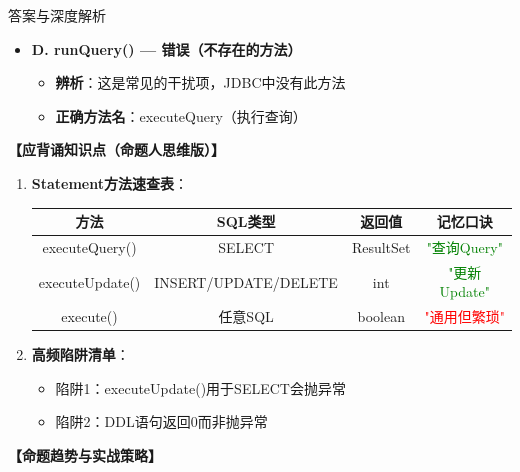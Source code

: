\documentclass[12pt, a4paper]{ctexart}
\begin{document}
\begin{enumerate}[label=\textbf{\arabic*.}]
\begin{bluebox}{答案与深度解析}
\begin{itemize}[label={}, leftmargin=*, nosep]
\begin{itemize}[label={}, nosep]
\begin{lstlisting}[language=Java]
    ResultSet rs = stmt.getResultSet();
} else {
    int updateCount = stmt.getUpdateCount();
}
      \end{lstlisting}
					  \end{itemize}
		      \item \textbf{D. runQuery() — 错误（不存在的方法）}
					  \begin{itemize}[label={}, nosep]
			      \item \textbf{辨析}：这是常见的干扰项，JDBC中没有此方法
			      \item \textbf{正确方法名}：executeQuery（执行查询）
					  \end{itemize}
					  \end{itemize}
\textbf{【应背诵知识点（命题人思维版）】}
		      \begin{enumerate}[label={}, leftmargin=*, nosep]
			      \item \textbf{Statement方法速查表}：
			            \begin{tabular}{|c|c|c|c|}
				            \hline
				            \textbf{方法}     & \textbf{SQL类型}       & \textbf{返回值} & \textbf{记忆口诀}                 \\
				            \hline
				            executeQuery()  & SELECT               & ResultSet    & \textcolor{green}{"查询Query"}  \\
				            \hline
				            executeUpdate() & INSERT/UPDATE/DELETE & int          & \textcolor{green}{"更新Update"} \\
				            \hline
				            execute()       & 任意SQL                & boolean      & \textcolor{red}{"通用但繁琐"}      \\
				            \hline
			            \end{tabular}

			      \item \textbf{高频陷阱清单}：
			            \begin{itemize}[label={}, nosep]
				            \item 陷阱1：executeUpdate()用于SELECT会抛异常
				            \item 陷阱2：DDL语句返回0而非抛异常
			            \end{itemize}
		      \end{enumerate}

		      \textbf{【命题趋势与实战策略】}


\end{bluebox}
\end{enumerate}
\end{document}
